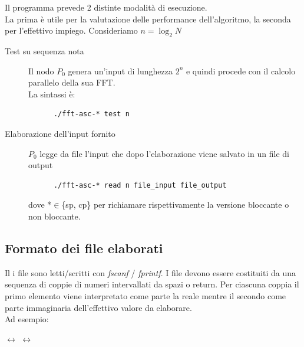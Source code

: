 \documentclass[12pt,a4paper,oneside,openright]{article}
\begin{document}
\noindent Il programma prevede 2 distinte modalità di esecuzione.\\
La prima è utile per la valutazione delle performance dell'algoritmo, la seconda per l'effettivo impiego.
Consideriamo $n=\log_{2}N$
\begin{description}
\item[ Test su sequenza nota ] Il nodo $P_{0}$ genera un'input di lunghezza $2^{n}$  e quindi procede con il calcolo parallelo della sua FFT. \\ La sintassi è:
\begin{verbatim}
      ./fft-asc-* test n
\end{verbatim}
\item[ Elaborazione dell'input fornito]  $P_{0}$ legge da file l'input che dopo l'elaborazione viene salvato in un file di output
\begin{verbatim}
      ./fft-asc-* read n file_input file_output
\end{verbatim}
dove *$\in$\{sp, cp\} per richiamare rispettivamente la versione bloccante o non bloccante.
\end{description}
\subsection{Formato dei file elaborati}
Il i file sono letti/scritti con \emph{fscanf}  / \emph{fprintf}. I file devono essere costituiti da una sequenza di coppie di numeri intervallati da spazi o return. Per ciascuna coppia il primo elemento viene interpretato come parte la reale mentre il secondo come parte immaginaria dell'effettivo valore da elaborare.\\
Ad esempio:\\
\begin{center}
 $\longleftrightarrow$ $\longleftrightarrow$  
\end{center}
\end{document}
